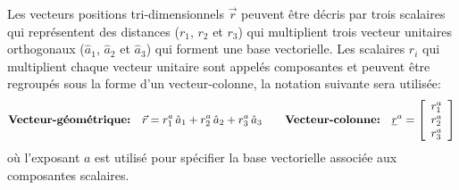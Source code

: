 Les vecteurs positions tri-dimensionnels $\vec{r}$ peuvent être décris par trois scalaires qui représentent des distances ($r_1$, $r_2$ et $r_3$) qui multiplient trois vecteur unitaires orthogonaux ($\hat{a}_1$, $\hat{a}_2$ et $\hat{a}_3$) qui forment une base vectorielle.  Les scalaires $r_i$ qui multiplient chaque vecteur unitaire sont appelés composantes et peuvent être regroupés sous la forme d'un vecteur-colonne, la notation suivante sera utilisée:
\begin{equation}
\text{\textbf{Vecteur-géométrique:}}\quad
\vec{r} = r_1^a \, \hat{a}_{1} + r_2^a \, \hat{a}_{2} + r_3^a \, \hat{a}_{3}
\quad \quad 
\text{\textbf{Vecteur-colonne:}}\quad
\underline{r}^{a} = \left[ \begin{array}{c} r_1^a \\ r_2^a \\ r_3^a  \end{array} \right] 
\label{eq:veccoldef}
\end{equation} 
où l'exposant $a$ est utilisé pour spécifier la base vectorielle associée aux composantes scalaires. 




